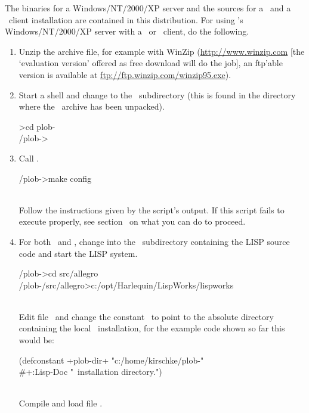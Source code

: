 The binaries for a Windows/NT/2000/XP server and the sources for a
\lwcl\ and a \allegrocl\ client installation are contained in this
distribution.  For using \plobwoexcl's Windows/NT/2000/XP server with
a \lwcl\ or \allegrocl\ client, do the following.
\begin{enumerate}

\item Unzip the archive file, for example with WinZip
(\url{http://www.winzip.com} [the `evaluation version' offered as free
download will do the job], an ftp'able version is available at
\url{ftp://ftp.winzip.com/winzip95.exe}).

\item Start a shell and change to the \ 
  subdirectory (this is found in the directory where the
  \ archive has been
  unpacked).\\[\smallskipamount]
\begin{tt}\CodeSize
\td>cd plob-\thisversion\\
\td/plob-\thisversion>
\end{tt}

\item\label{itm:ntconfig} Call .\\[\smallskipamount]
\begin{tt}\CodeSize
\td/plob-\thisversion>make config
\end{tt}\\[\smallskipamount]
 Follow the instructions given by the script's output.  If this script
 fails to execute properly, see
 section~ on what you can do to
 proceed.
 
\item\label{itm:ntcompile} For both \lwcl\ and \allegrocl, change into
  the \lisp{\td/plob-\thisversion/\lb{}src/\lb{}allegro}\ subdirectory
  containing the LISP source code and start the LISP
  system.\\[\smallskipamount]
\begin{tt}\CodeSize
\td/plob-\thisversion>cd src/allegro\\
\td/plob-\thisversion/src/allegro>c:/opt/Harlequin/LispWorks/lispworks
\end{tt}\\[\smallskipamount]
Edit file \ and change the constant
\ to point to the absolute directory containing
the local \plob\ installation, for the example code shown so far this
would be:\\[\smallskipamount]
\begin{tt}\CodeSize
(defconstant +plob-dir+ "c:/home/kirschke/plob-\thisversion"\\
\hspace*{2em}\#+:Lisp-Doc "\plob\ installation directory.")
\end{tt}\\[\smallskipamount]
Compile and load file .


\end{enumerate}
